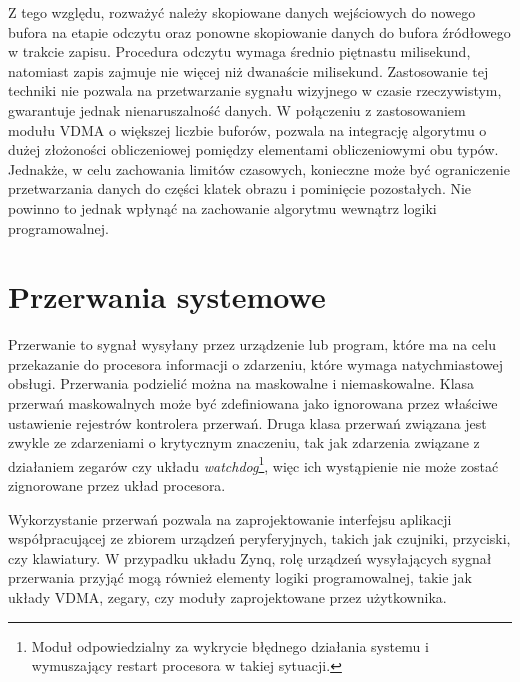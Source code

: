 Z tego względu, rozważyć należy skopiowane danych wejściowych do nowego bufora na etapie odczytu oraz ponowne skopiowanie danych do bufora źródłowego w trakcie zapisu. 
Procedura odczytu wymaga średnio piętnastu milisekund, natomiast zapis zajmuje nie więcej niż dwanaście milisekund. 
Zastosowanie tej techniki nie pozwala na przetwarzanie sygnału wizyjnego w czasie rzeczywistym, gwarantuje jednak nienaruszalność danych. 
W połączeniu z zastosowaniem modułu VDMA o większej liczbie buforów, pozwala na integrację algorytmu o dużej złożoności obliczeniowej pomiędzy elementami obliczeniowymi obu typów. 
Jednakże, w celu zachowania limitów czasowych, konieczne może być ograniczenie przetwarzania danych do części klatek obrazu i pominięcie pozostałych. 
Nie powinno to jednak wpłynąć na zachowanie algorytmu wewnątrz logiki programowalnej.


\section{Przerwania systemowe}
\label{sec:axi-interrupts}

Przerwanie to sygnał wysyłany przez urządzenie lub program, które ma na celu przekazanie do procesora informacji o zdarzeniu, które wymaga natychmiastowej obsługi.
Przerwania podzielić można na maskowalne i niemaskowalne. 
Klasa przerwań maskowalnych może być zdefiniowana jako ignorowana przez właściwe ustawienie rejestrów kontrolera przerwań. 
Druga klasa przerwań związana jest zwykle ze zdarzeniami o krytycznym znaczeniu, tak jak zdarzenia związane z działaniem zegarów czy układu \emph{watchdog}\footnote{Moduł odpowiedzialny za wykrycie błędnego działania systemu i wymuszający restart procesora w takiej sytuacji.}, więc ich wystąpienie nie może zostać zignorowane przez układ procesora. 

Wykorzystanie przerwań pozwala na zaprojektowanie interfejsu aplikacji współpracującej ze zbiorem urządzeń peryferyjnych, takich jak czujniki, przyciski, czy klawiatury. 
W przypadku układu Zynq, rolę urządzeń wysyłających sygnał przerwania przyjąć mogą również elementy logiki programowalnej, takie jak układy VDMA, zegary, czy moduły zaprojektowane przez użytkownika.

